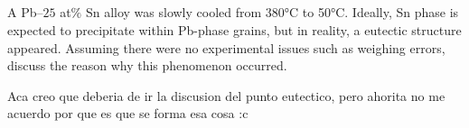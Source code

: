 \subsection{}
A Pb–$25$ at$\%$ Sn alloy was slowly cooled from 380°C to 50°C. Ideally, Sn phase is expected to precipitate within Pb-phase grains, but in reality, a eutectic structure appeared. Assuming there were no experimental issues such as weighing errors, discuss the reason why this phenomenon occurred.

Aca creo que deberia de ir la discusion del punto eutectico, pero ahorita no me acuerdo por que es que se forma esa cosa :c
